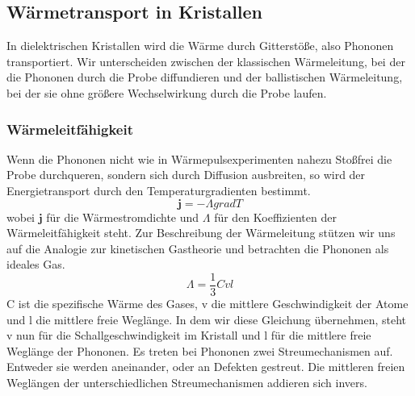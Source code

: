 \documentclass[11pt]{article}
\begin{document}
\subsection{Wärmetransport in Kristallen}
In dielektrischen Kristallen wird die Wärme durch Gitterstöße, also Phononen
transportiert. Wir unterscheiden zwischen der klassischen Wärmeleitung, bei der
die Phononen durch die Probe diffundieren und der ballistischen Wärmeleitung,
bei der sie ohne größere Wechselwirkung durch die Probe laufen.
\subsubsection{Wärmeleitfähigkeit}
Wenn die Phononen nicht wie in Wärmepulsexperimenten nahezu Stoßfrei die Probe
durchqueren, sondern sich durch Diffusion ausbreiten, so wird der
Energietransport durch den Temperaturgradienten bestimmt.
\begin{equation}
  \bm{j}=-\Lambda grad T
\end{equation}
wobei $\bm{j}$ für die Wärmestromdichte und $\Lambda$ für den Koeffizienten der
Wärmeleitfähigkeit steht. Zur Beschreibung der Wärmeleitung stützen wir uns auf
die Analogie zur kinetischen Gastheorie und betrachten die Phononen als ideales
Gas.
\begin{equation}
  \Lambda=\frac{1}{3}Cvl
\end{equation}
C ist die spezifische Wärme des Gases, v die mittlere Geschwindigkeit der Atome
und l die mittlere freie Weglänge. In dem wir diese Gleichung übernehmen, steht
v nun für die Schallgeschwindigkeit im Kristall und l für die mittlere freie
Weglänge der Phononen. Es treten bei Phononen zwei Streumechanismen auf.
Entweder sie werden aneinander, oder an Defekten gestreut. Die mittleren freien
Weglängen der unterschiedlichen Streumechanismen addieren sich invers.
\end{document}
